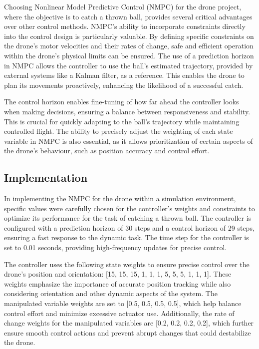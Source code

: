 \documentclass{UoNMCHA}
\numberwithin{equation}{section}
\begin{document}
Choosing Nonlinear Model Predictive Control (NMPC) for the drone project, where the objective is to catch a thrown ball, provides several critical advantages over other control methods. NMPC's ability to incorporate constraints directly into the control design is particularly valuable. By defining specific constraints on the drone's motor velocities and their rates of change, safe and efficient operation within the drone's physical limits can be ensured. The use of a prediction horizon in NMPC allows the controller to use the ball's estimated trajectory, provided by external systems like a Kalman filter, as a reference. This enables the drone to plan its movements proactively, enhancing the likelihood of a successful catch.

The control horizon enables fine-tuning of how far ahead the controller looks when making decisions, ensuring a balance between responsiveness and stability. This is crucial for quickly adapting to the ball's trajectory while maintaining controlled flight. The ability to precisely adjust the weighting of each state variable in NMPC is also essential, as it allows prioritization of certain aspects of the drone's behaviour, such as position accuracy and control effort.
\subsection{Implementation}

In implementing the NMPC for the drone within a simulation environment, specific values were carefully chosen for the controller's weights and constraints to optimize its performance for the task of catching a thrown ball. The controller is configured with a prediction horizon of 30 steps and a control horizon of 29 steps, ensuring a fast response to the dynamic task. The time step for the controller is set to 0.01 seconds, providing high-frequency updates for precise control.

The controller uses the following state weights to ensure precise control over the drone's position and orientation: [15, 15, 15, 1, 1, 1, 5, 5, 5, 1, 1, 1]. These weights emphasize the importance of accurate position tracking while also considering orientation and other dynamic aspects of the system. The manipulated variable weights are set to [0.5, 0.5, 0.5, 0.5], which help balance control effort and minimize excessive actuator use. Additionally, the rate of change weights for the manipulated variables are [0.2, 0.2, 0.2, 0.2], which further ensure smooth control actions and prevent abrupt changes that could destabilize the drone.
\end{document}
